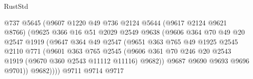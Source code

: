 \begin{lexlean}{RustStd}
\begin{coremodule}
{\begin{coremodule}
{{{{{{{{{{{{{{{{{{{{{{{{{{{{{{{{{{{{{{{{{{{                                @737
                                @5645
                                (@9607
                                  @1220
                                  @49
                                  @736
                                  @2124
                                  @5644
                                  (@9617 @2124 @9621 @8766)
                                  (@9625
                                    @366
                                    @16
                                    @51
                                    @2029
                                    @2549
                                    @9638
                                    (@9606
                                      @364
                                      @70
                                      @49
                                      @20
                                      @2547
                                      @1919
                                      (@9647
                                        @364
                                        @49
                                        @2547
                                        (@9651
                                          @363
                                          @765
                                          @49
                                          @1925
                                          @2545
                                          @2110
                                          @771
                                          (@9601
                                            @363
                                            @765
                                            @2545
                                            (@9606
                                              @361
                                              @70
                                              @246
                                              @20
                                              @2543
                                              @1919
                                              (@9670 @360 @2543 @11112 @11116)
                                              @9682))
                                          @9687
                                          @9690
                                          @9693
                                          @9696
                                          @9701))
                                      @9682))))
                              @9711
                              @9714
                              @9717
}}}}}}}}}}}}}}}}}}}}}}}}}}}}}}}}}}}}}}}}}}}
\end{coremodule}}
\end{coremodule}
\end{lexlean}
